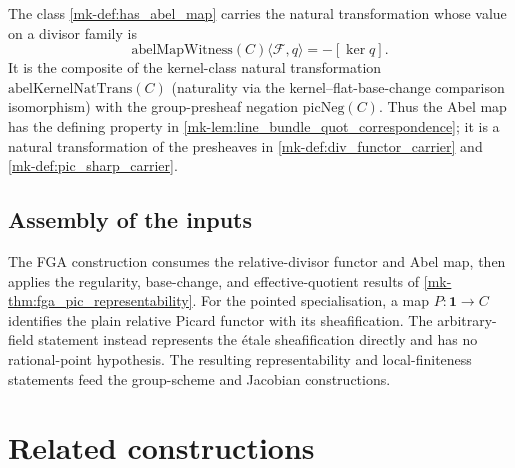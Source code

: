 The class \ref{mk-def:has_abel_map} carries the natural transformation whose
value on a divisor family is
\[
  \mathrm{abelMapWitness}(C)\langle\mathcal F,q\rangle=-[\ker q].
\]
It is the composite of the kernel-class natural transformation
\(\mathrm{abelKernelNatTrans}(C)\) (naturality via the kernel--flat-base-change
comparison isomorphism) with the group-presheaf negation
\(\mathrm{picNeg}(C)\). Thus the Abel map has the defining property in
\ref{mk-lem:line_bundle_quot_correspondence}; it is a natural transformation
of the presheaves in \ref{mk-def:div_functor_carrier} and
\ref{mk-def:pic_sharp_carrier}.

\subsection{Assembly of the inputs}
\label{mk-subsec:fga_pic_closure_order_summary}

The FGA construction consumes the relative-divisor functor and Abel map,
then applies the regularity, base-change, and effective-quotient results of
\ref{mk-thm:fga_pic_representability}. For the pointed specialisation, a map
\(P:\mathbf 1\to C\) identifies the plain relative Picard functor with its
sheafification. The arbitrary-field statement instead represents the \'etale
sheafification directly and has no rational-point hypothesis. The resulting
representability and local-finiteness statements feed the group-scheme and
Jacobian constructions.

\section{Related constructions}
\label{mk-sec:fga_pic_out_of_scope}

